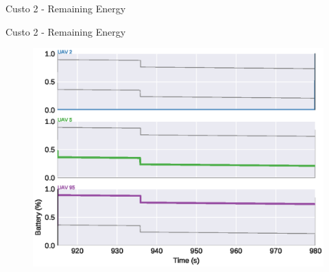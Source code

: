 \begin{frame}{Custo 2 - Remaining Energy}
\begin{figure}[!htb]
                    \end{figure}
                \end{frame}\begin{frame}{Custo 2 - Remaining Energy}
                    \begin{figure}[!htb]
                        \includegraphics[width=\textwidth]{custo_2/uav_remaining_energy_980.eps}
                    \end{figure}
                \end{frame}